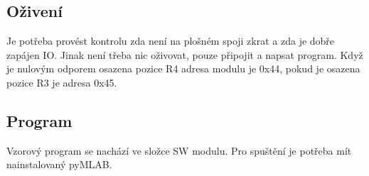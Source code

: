 \documentclass[12pt,a4paper]{article}
\begin{document}
\subsection{Oživení}\label{oux17eivenuxed}

Je potřeba provést kontrolu zda není na plošném spoji zkrat a zda je
dobře zapájen IO. Jinak není třeba nic oživovat, pouze připojit a napsat
program. Když je nulovým odporem osazena pozice R4 adresa modulu je
0x44, pokud je osazena pozice R3 je adresa 0x45.

\subsection{Program}\label{program}

Vzorový program se nachází ve složce SW modulu. Pro spuštění je potřeba
mít nainstalovaný pyMLAB.
\end{document}
